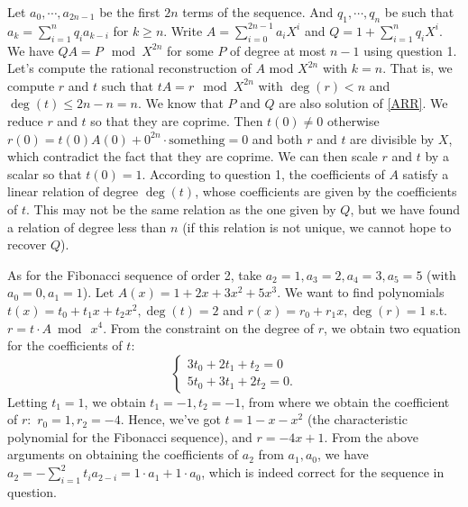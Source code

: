 \documentclass[11pt]{exam}
\theoremstyle{definition}
\begin{document}
{\begin{questions}
\begin{solution}
		Let $a_0, \cdots, a_{2n-1}$ be the first $2n$ terms of the sequence. And $q_1, \cdots, q_n$ be such that $a_k = \sum_{i = 1}^n q_i a_{k-i}$ for $k \geq n$. Write $A = \sum_{i = 0}^{2n-1} a_i X^i$ and $Q = 1+\sum_{i = 1}^n q_i X^i$. We have $QA = P \mod X^{2n}$ for some $P$ of degree at most $n-1$ using question 1.
		Let's compute the rational reconstruction of $A$ mod $X^{2n}$ with $k = n$. That is, we compute $r$ and $t$ such that $tA = r \mod X^{2n}$ with $\deg(r) < n$ and $\deg(t) \leq 2n-n = n$. We know that $P$ and $Q$ are also solution of \ref{ARR}.  We reduce $r$ and $t$ so that they are coprime. Then $t(0) \neq 0$ otherwise $r(0) = t(0) A(0) + 0^{2n} \cdot \text{something} = 0$ and both $r$ and $t$ are divisible by $X$, which contradict the fact that they are coprime. We can then scale $r$ and $t$ by a scalar so that $t(0) = 1$. According to question 1, the coefficients of $A$ satisfy a linear relation of degree $\deg(t)$, whose coefficients are given by the coefficients of $t$. This may not be the same relation as the one given by $Q$, but we have found a relation of degree less than $n$ (if this relation is not unique, we cannot hope to recover $Q$).
		
		As for the Fibonacci sequence of order 2, take $a_2=1, a_3=2, a_4=3, a_5 = 5$ (with $a_0 = 0, a_1=1$). Let $A(x) = 1+2x+3x^2+5x^3$. We want to find polynomials $t(x) = t_0 +t_1x+t_2x^2, \deg(t) =2$ and $r(x)=r_0 + r_1x, \deg(r)=  1$ s.t.\ $r = t \cdot A \bmod~x^4$. From the constraint on the degree of $r$, we obtain two equation for the coefficients of $t$:
		\[
		\begin{cases}
			3t_0+2t_1+t_2 = 0\\
			5t_0+3t_1+2t_2 = 0.
		\end{cases}
	\]
	Letting $t_1 = 1$, we obtain $t_1 = -1, t_2 = -1$, from where we obtain the coefficient of $r:$ $r_0= 1, r_2 = -4$. Hence, we've got $t = 1-x-x^2$ (the characteristic polynomial for the Fibonacci sequence), and $r = -4x+1$. From the above arguments on obtaining the coefficients of $a_2$ from $a_1, a_0$, we have $a_2 = - \sum_{i=1}^2 t_i a_{2-i} = 1 \cdot a_1 + 1 \cdot a_0$, which is indeed correct for the sequence in question.
	\end{solution}
	
\end{questions}


}
\end{document}
